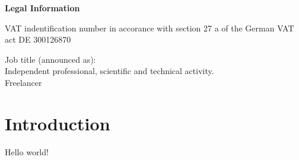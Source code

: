 \begin{flushleft}
    \textbf{Legal Information}
\end{flushleft}
\begin{minipage}[l]{0.49\textwidth}
    \begin{flushleft}
            VAT indentification number in accorance with section 27 a of the German VAT act
DE 300126870
    \end{flushleft}
\end{minipage}
\begin{minipage}[r]{0.49\textwidth}
    \begin{flushright}
        Job title (announced as):\\
        Independent professional, scientific and technical activity.\\
        Freelancer
    \end{flushright}
\end{minipage}
\newpage
\tableofcontents

\newpage
\section{Introduction}
\label{s:introductino}
Hello world!

\newpage
\nocite{*}
%



